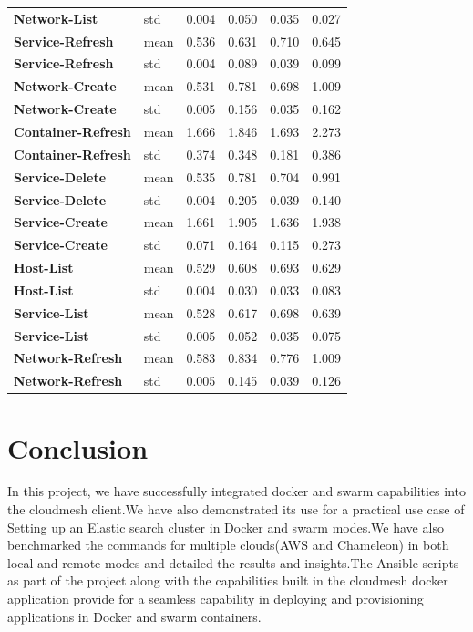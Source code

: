 \documentclass[9pt,twocolumn,twoside]{../../styles/osajnl}
\begin{document}
\begin{table}[t]
\begin{tabular}{|l|l|l|p{.86cm}|l|p{0.86cm}|}
\textbf{Network-List} & std & 0.004 & 0.050 & 0.035 & 0.027 \\
\textbf{Service-Refresh} & mean & 0.536 & 0.631 & 0.710 & 0.645 \\
\textbf{Service-Refresh} & std & 0.004 & 0.089 & 0.039 & 0.099 \\
\textbf{Network-Create} & mean & 0.531 & 0.781 & 0.698 & 1.009 \\
\textbf{Network-Create} & std & 0.005 & 0.156 & 0.035 & 0.162 \\
\textbf{Container-Refresh} & mean & 1.666 & 1.846 & 1.693 & 2.273 \\
\textbf{Container-Refresh} & std & 0.374 & 0.348 & 0.181 & 0.386 \\
\textbf{Service-Delete} & mean & 0.535 & 0.781 & 0.704 & 0.991 \\
\textbf{Service-Delete} & std & 0.004 & 0.205 & 0.039 & 0.140 \\
\textbf{Service-Create} & mean & 1.661 & 1.905 & 1.636 & 1.938 \\
\textbf{Service-Create} & std & 0.071 & 0.164 & 0.115 & 0.273 \\
\textbf{Host-List} & mean & 0.529 & 0.608 & 0.693 & 0.629 \\
\textbf{Host-List} & std & 0.004 & 0.030 & 0.033 & 0.083 \\
\textbf{Service-List} & mean & 0.528 & 0.617 & 0.698 & 0.639 \\
\textbf{Service-List} & std & 0.005 & 0.052 & 0.035 & 0.075 \\
\textbf{Network-Refresh} & mean & 0.583 & 0.834 & 0.776 & 1.009 \\
\textbf{Network-Refresh} & std & 0.005 & 0.145 & 0.039 & 0.126\\
\hline
\end{tabular}
\end{table}

\clearpage
\section{Conclusion}

In this project, we have successfully integrated docker and swarm capabilities into the cloudmesh client.We have also demonstrated its use for a practical use case of
Setting up an Elastic search cluster in Docker and swarm modes.We have also benchmarked the commands for multiple clouds(AWS and Chameleon) in both local and remote modes and detailed the results and insights.The Ansible scripts
as part of the project along with the capabilities built in the cloudmesh docker 
application provide for a seamless capability in deploying and provisioning applications
in Docker and swarm containers.
\end{document}
